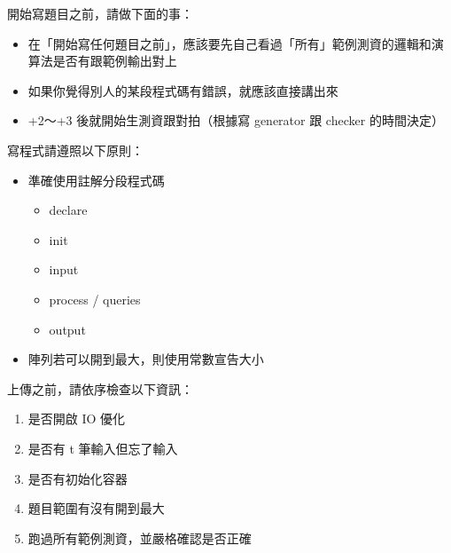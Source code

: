 開始寫題目之前，請做下面的事：
\begin{itemize}
    \item 在「開始寫任何題目之前」，應該要先自己看過「所有」範例測資的邏輯和演算法是否有跟範例輸出對上
    \item 如果你覺得別人的某段程式碼有錯誤，就應該直接講出來
    \item +2～+3 後就開始生測資跟對拍（根據寫 generator 跟 checker 的時間決定）
\end{itemize}

寫程式請遵照以下原則：
\begin{itemize}
    \item 準確使用註解分段程式碼
    \begin{itemize}
        \item declare
        \item init
        \item input
        \item process / queries
        \item output
    \end{itemize}
    \item 陣列若可以開到最大，則使用常數宣告大小
\end{itemize}

上傳之前，請依序檢查以下資訊：
\begin{enumerate}
    \item 是否開啟 IO 優化
    \item 是否有 t 筆輸入但忘了輸入
    \item 是否有初始化容器
    \item 題目範圍有沒有開到最大
    \item 跑過所有範例測資，並嚴格確認是否正確
\end{enumerate}
